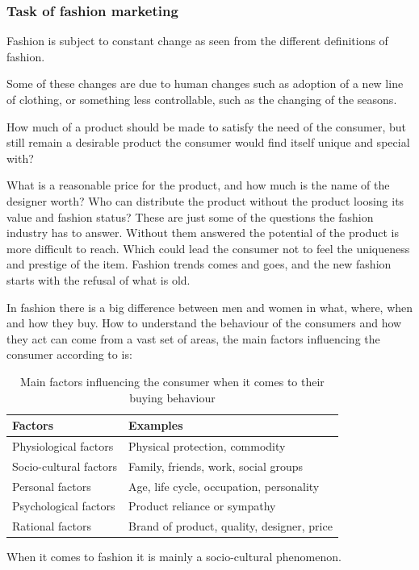 \subsubsection{Task of fashion marketing}
  Fashion is subject to constant change as seen from the different definitions of
  fashion.

  Some of these changes are due to human changes such as adoption of a new line
  of clothing, or something less controllable, such as the changing of the
  seasons.

  How much of a product should be made to satisfy the need of the consumer, but
  still remain a desirable product the consumer would find itself unique and
  special with?

  What is a reasonable price for the product, and how much is the name of the
  designer worth?  Who can distribute the product without the product loosing its
  value and fashion status?  These are just some of the questions the fashion
  industry has to answer.  Without them answered the potential of the product
  is more difficult to reach.  Which could lead the consumer not to feel the uniqueness and
  prestige of the item.  Fashion trends comes and goes, and the new fashion
  starts with the refusal of what is old.

  In fashion there is a big difference between men and women in what, where, when
  and how they buy.  How to understand the behaviour of the consumers and how they
  act can come from a vast set of areas, the main factors influencing the
  consumer according to \cite{kotler2009marketing} is:

  \begin{table}[H]
      \centering
      \begin{tabular}{l l}
      \toprule
        Factors        			& Examples \\ \midrule
        Physiological factors   & Physical protection, commodity \\ 
        Socio-cultural factors  & Family, friends, work, social groups  \\ 
        Personal factors        & Age, life cycle, occupation, personality \\ 
        Psychological factors   & Product reliance or sympathy \\  %
        Rational factors        & Brand of product, quality, designer, price \\
      \bottomrule
      \end{tabular}
      \caption[Fashion Factors]{Main factors influencing the consumer when it comes to their buying behaviour}
      \label{table:FashionFactors}
  \end{table}
  When it comes to fashion it is mainly a socio-cultural phenomenon.

